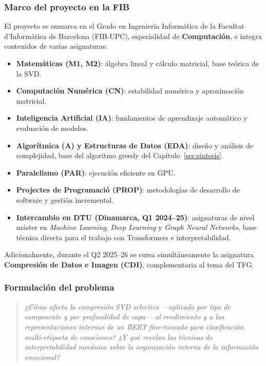 \subsubsection{Marco del proyecto en la FIB}

El proyecto se enmarca en el Grado en Ingeniería Informática de la
Facultat d'Informàtica de Barcelona (FIB-UPC), especialidad de
\textbf{Computación}, e integra contenidos de varias asignaturas:

\begin{itemize}[nosep]
    \item \textbf{Matemáticas (M1, M2)}: álgebra lineal y cálculo
    matricial, base teórica de la SVD.
    \item \textbf{Computación Numérica (CN)}: estabilidad numérica y
    aproximación matricial.
    \item \textbf{Inteligencia Artificial (IA)}: fundamentos de
    aprendizaje automático y evaluación de modelos.
    \item \textbf{Algorítmica (A) y Estructuras de Datos (EDA)}: diseño
    y análisis de complejidad, base del algoritmo greedy del
    Capítulo~\ref{sec:sintesis}.
    \item \textbf{Paralelismo (PAR)}: ejecución eficiente en GPU.
    \item \textbf{Projectes de Programació (PROP)}: metodologías de
    desarrollo de software y gestión incremental.
    \item \textbf{Intercambio en DTU (Dinamarca, Q1 2024--25)}:
    asignaturas de nivel máster en \emph{Machine Learning},
    \emph{Deep Learning} y \emph{Graph Neural Networks}, base técnica
    directa para el trabajo con Transformers e interpretabilidad.
\end{itemize}

Adicionalmente, durante el Q2 2025--26 se cursa simultáneamente la
asignatura \textbf{Compresión de Datos e Imagen (CDI)}, complementaria
al tema del TFG.

\subsubsection{Formulación del problema}

\begin{quote}
    \emph{¿Cómo afecta la compresión SVD selectiva ---aplicada por tipo
    de componente y por profundidad de capa--- al rendimiento y a las
    representaciones internas de un BERT fine-tuneado para
    clasificación multi-etiqueta de emociones? ¿Y qué revelan las
    técnicas de interpretabilidad mecánica sobre la organización
    interna de la información emocional?}
\end{quote}

